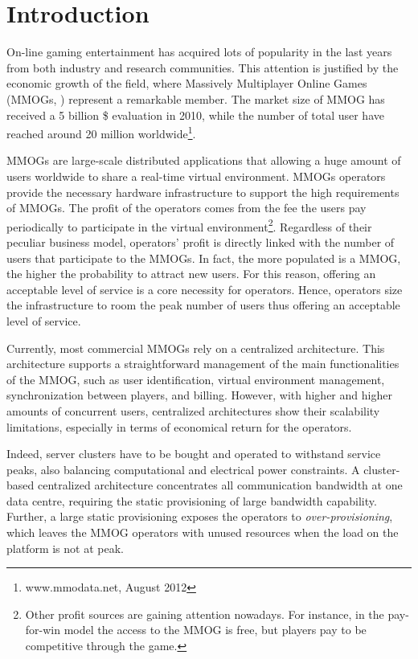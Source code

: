 \documentclass[final,10pt,a5paper]{phdimt}
\theoremstyle{definition}
\begin{document}
\mainmatter

\clearpage{}
\chapter{Introduction}



On-line gaming entertainment has acquired lots of popularity in the last years from both industry and research communities.
This attention is justified by the economic growth of the field, where Massively Multiplayer Online Games (MMOGs, \cite{wow-site,sl-site}) represent a remarkable member.
The market size of MMOG has received a 5 billion \$ evaluation in 2010, while the number of total user have reached around 20 million worldwide\footnote{www.mmodata.net, August 2012}. 


MMOGs are large-scale distributed applications that allowing a huge amount of users worldwide to share a real-time virtual environment.
MMOGs operators provide the necessary hardware infrastructure to support the high requirements of MMOGs. 
The profit of the operators comes from the fee the users pay periodically to participate in the virtual environment\footnote{Other profit sources are gaining attention nowadays. For instance, in the pay-for-win model the access to the MMOG is free, but players pay to be competitive through the game.}.
Regardless of their peculiar business model, operators' profit is directly linked with the number of users that participate to the MMOGs. In fact, the more populated is a MMOG, the higher the probability to attract new users.
For this reason, offering an acceptable level of service is a core necessity for operators. 
Hence, operators size the infrastructure to room the peak number of users thus offering an acceptable level of service.

Currently, most commercial MMOGs rely on a centralized architecture.
This architecture supports a straightforward management of the main functionalities of the MMOG, such as user identification, virtual environment management, synchronization between players, and billing. 
However, with higher and higher amounts of concurrent users, centralized architectures show their scalability limitations, especially in terms of economical return for the operators.

Indeed, server clusters have to be bought and operated to withstand service peaks, also balancing computational and electrical power
constraints. 
A cluster-based centralized architecture concentrates all communication bandwidth at one data centre, requiring the static provisioning of large bandwidth capability.
Further, a large static provisioning exposes the operators to \textit{over-provisioning}, which leaves the MMOG operators with unused resources when the load on the platform is not at peak.
\end{document}
